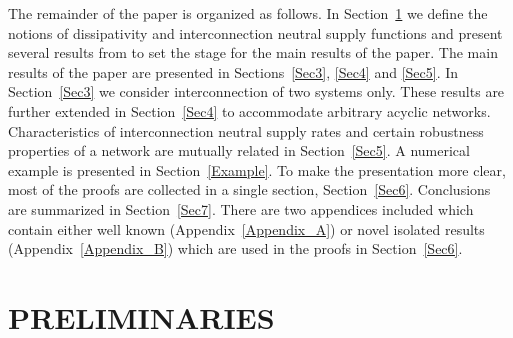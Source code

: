 \documentclass[11pt,a4paper,oneside,DIV=12,headings=small]{scrartcl}
\theoremstyle{plain}
\begin{document}
The remainder of the paper is organized as follows. In Section~\ref{Sec2} we define the notions of dissipativity and interconnection neutral supply functions and present several results from \cite{Willems_1} to set the stage for the main results of the paper. The main results of the paper are presented in Sections~\ref{Sec3}, \ref{Sec4} and \ref{Sec5}. In Section~\ref{Sec3} we consider interconnection of two systems only. These results are further extended in Section~\ref{Sec4} to accommodate arbitrary acyclic networks. Characteristics of interconnection neutral supply rates and certain robustness properties of a network are mutually related in Section~\ref{Sec5}. A numerical example is presented in Section~\ref{Example}. To make the presentation more clear, most of the proofs are collected in a single section, Section~\ref{Sec6}. Conclusions are summarized in Section~\ref{Sec7}. There are two appendices included which contain either well known (Appendix~\ref{Appendix_A}) or novel isolated results (Appendix~\ref{Appendix_B}) which are used in the proofs in Section~\ref{Sec6}.


\section{PRELIMINARIES}
\label{Sec2}

\end{document}
